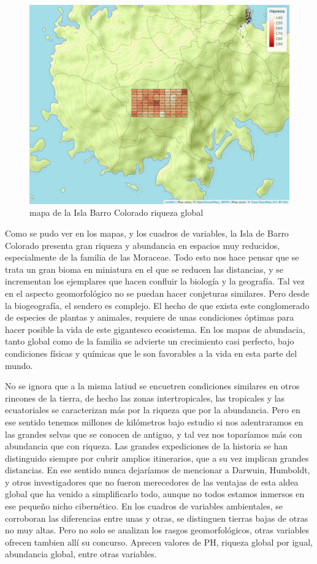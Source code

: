 \documentclass[11pt,]{article}
\begin{document}
\begin{figure}
\centering
\includegraphics[width=1.00000\textwidth]{mapa_cuadros_riq_global.png}
\caption{mapa de la Isla Barro Colorado riqueza global
\label{fig:bci_map}}
\end{figure}

Como se pudo ver en los mapas, y los cuadros de variables, la Isla de
Barro Colorado presenta gran riqueza y abundancia en espacios muy
reducidos, especialmente de la familia de las Moraceae. Todo esto nos
hace pensar que se trata un gran bioma en miniatura en el que se reducen
las distancias, y se incrementan los ejemplares que hacen confluir la
biología y la geografía. Tal vez en el aspecto geomorfológico no se
puedan hacer conjeturas similares. Pero desde la biogeografía, el
sendero es complejo. El hecho de que exista este conglomerado de
especies de plantas y animales, requiere de unas condiciones óptimas
para hacer posible la vida de este gigantesco ecosistema. En los mapas
de abundacia, tanto global como de la familia se advierte un crecimiento
casi perfecto, bajo condiciones físicas y químicas que le son favorables
a la vida en esta parte del mundo.

No se ignora que a la misma latiud se encuetren condiciones similares en
otros rincones de la tierra, de hecho las zonas intertropicales, las
tropicales y las ecuatoriales se caracterizan más por la riqueza que por
la abundancia. Pero en ese sentido tenemos millones de kilómetros bajo
estudio si nos adentraramos en las grandes selvas que se conocen de
antiguo, y tal vez nos toparíamos más con abundancia que con riqueza.
Las grandes expediciones de la historia se han distinguido siempre por
cubrir amplios itinerarios, que a su vez implican grandes distancias. En
ese sentido nunca dejaríamos de mencionar a Darwuin, Humboldt, y otros
investigadores que no fueron merecedores de las ventajas de esta aldea
global que ha venido a simplificarlo todo, aunque no todos estamos
inmersos en ese pequeño nicho cibernético. En los cuadros de variables
ambientales, se corroboran las diferencias entre unas y otras, se
distinguen tierras bajas de otras no muy altas. Pero no solo se analizan
los rasgos geomorfológicos, otras variables ofrecen tambien allí su
concurso. Aprecen valores de PH, riqueza global por igual, abundancia
global, entre otras variables.
\end{document}
